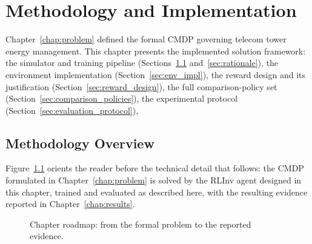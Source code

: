 \chapter{Methodology and Implementation}
\label{chap:methodology}

Chapter~\ref{chap:problem} defined the formal CMDP governing telecom tower
energy management. This chapter presents the implemented solution
framework: the simulator and training pipeline (Sections~\ref{sec:overview}
and~\ref{sec:rationale}), the environment implementation
(Section~\ref{sec:env_impl}), the reward design and its justification
(Section~\ref{sec:reward_design}), the full comparison-policy set
(Section~\ref{sec:comparison_policies}), the experimental protocol
(Section~\ref{sec:evaluation_protocol}), 

\section{Methodology Overview}
\label{sec:overview}

Figure~\ref{fig:chapter_roadmap} orients the reader before the technical
detail that follows: the CMDP formulated in Chapter~\ref{chap:problem} is
solved by the RLInv agent designed in this chapter, trained and
evaluated as described here, with the resulting evidence reported in
Chapter~\ref{chap:results}.

\begin{figure}[htbp]
\centering
{}%
\caption{Chapter roadmap: from the formal problem to the reported evidence.}
\label{fig:chapter_roadmap}
\end{figure}



